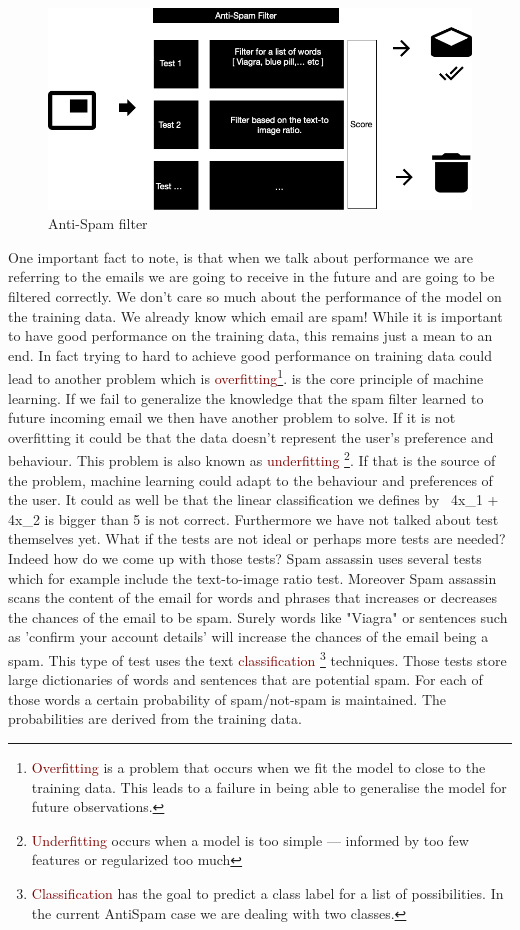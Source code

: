\documentclass{tufte-handout}
\newcommand{\hlred}[1]{\textcolor{Maroon}{#1}}%
\begin{document}
\begin{figure}[h]%
  \includegraphics[width=\linewidth]{antispam.png}
  \caption{Anti-Spam filter}
  \label{fig:packages}
\end{figure}
One important fact to note, is that when we talk about performance we are referring to the emails we are going to receive in the future and are going to be filtered correctly. We don't care so much about the performance of the model on the training data. We already know which email are spam!
While it is important to have good performance on the training data, this remains just a mean to an end. In fact trying to hard to achieve good performance on training data could lead to another problem which is \hlred{overfitting}\footnote{\hlred{Overfitting} is a problem that occurs when we fit the model to close to the training data. This leads to a failure in being able to generalise the model for future observations.}.
 is the core principle of machine learning. If we fail to generalize the knowledge that the spam filter learned to future incoming email we then have another problem to solve. If it is not overfitting it could be that the data doesn't represent the user's preference and behaviour. This problem is also known as \hlred{underfitting} \footnote{\hlred{Underfitting}  occurs when a model is too simple — informed by too few features or regularized too much}. If that is the source of the problem, machine learning could adapt to the behaviour and preferences of the user. It could as well be that the linear classification we defines by \ 4x_{1} + 4x_{2} \] is bigger than 5 is not correct. Furthermore we have not talked about test  themselves yet. What if the tests are not ideal or perhaps more tests are needed? Indeed how do we come up with those tests? Spam assassin uses several tests which for example include the text-to-image ratio test. Moreover Spam assassin scans the content of the email for words and phrases that increases or decreases the chances of the email to be spam. Surely words like "Viagra" or sentences such as 'confirm your account details' will increase the chances of the email being a spam. This type of test uses the text \hlred{classification} \footnote{\hlred{Classification} has the goal to predict a class label for a list of possibilities. In the current AntiSpam case we are dealing with two classes.} techniques. Those tests store large dictionaries of words and sentences that are potential spam. For each of those words a certain probability of spam/not-spam is maintained. The probabilities are derived from the training data. 
\end{document}
